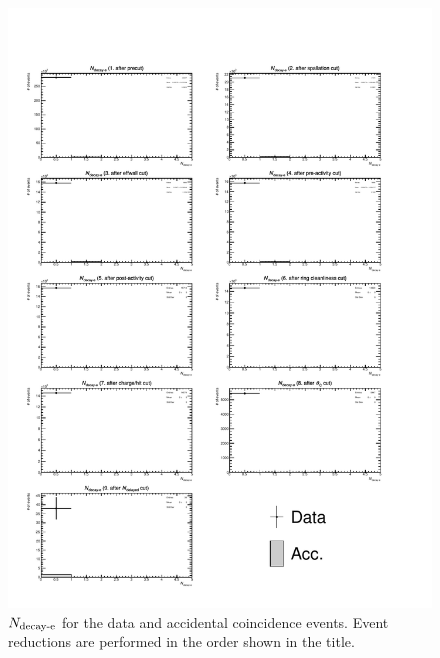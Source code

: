\begin{figure}[h]
	\centering
	\includegraphics[width=15cm]{PDF/Dist_Data/Che_50deg_tag_ge1/nmue}
	\caption[$N_{\rm decay\mathchar`-e}$ for the data and accidental coincidence events]{
	$N_{\rm decay\mathchar`-e}$ for the data and accidental coincidence events.
	Event reductions are performed in the order shown in the title.
	}\label{Data_nmue}
\end{figure}

